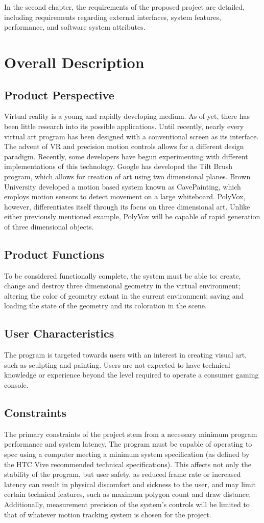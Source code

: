 \documentclass[onecolumn, draftclsnofoot,10pt, compsoc]{IEEEtran}
\begin{document}
In the second chapter, the requirements of the proposed project are detailed, including requirements regarding external interfaces, system features, performance, and software system attributes.
\section{Overall Description}
\subsection{Product Perspective}
Virtual reality is a young and rapidly developing medium. As of yet, there has been little research into its possible applications. Until recently, nearly every virtual art program has been designed with a conventional screen as its interface. The advent of VR and precision motion controls allows for a different design paradigm. Recently, some developers have begun experimenting with different implementations of this technology. Google has developed the Tilt Brush program, which allows for creation of art using two dimensional planes. Brown University developed a motion based system known as CavePainting, which employs motion sensors to detect movement on a large whiteboard. PolyVox, however, differentiates itself through its focus on three dimensional art. Unlike either previously mentioned example, PolyVox will be capable of rapid generation of three dimensional objects.\cite{cave}\cite{tilt}
\subsection{Product Functions}
 To be considered functionally complete, the system must be able to: create, change and destroy three dimensional geometry in the virtual environment; altering the color of geometry extant in the current environment; saving and loading the state of the geometry and its coloration in the scene.
\subsection{User Characteristics}
The program is targeted towards users with an interest in creating visual art, such as sculpting and painting. Users are not expected to have technical knowledge or experience beyond the level required to operate a consumer gaming console.
\subsection{Constraints}
The primary constraints of the project stem from a necessary minimum program performance and system latency. The program must be capable of operating to spec using a computer meeting a minimum system specification (as defined by the HTC Vive recommended technical specifications). This affects not only the stability of the program, but user safety, as reduced frame rate or increased latency can result in physical discomfort and sickness to the user, and may limit certain technical features, such as maximum polygon count and draw distance. Additionally, measurement precision of the system’s controls will be limited to that of whatever motion tracking system is chosen for the project.
\end{document}
